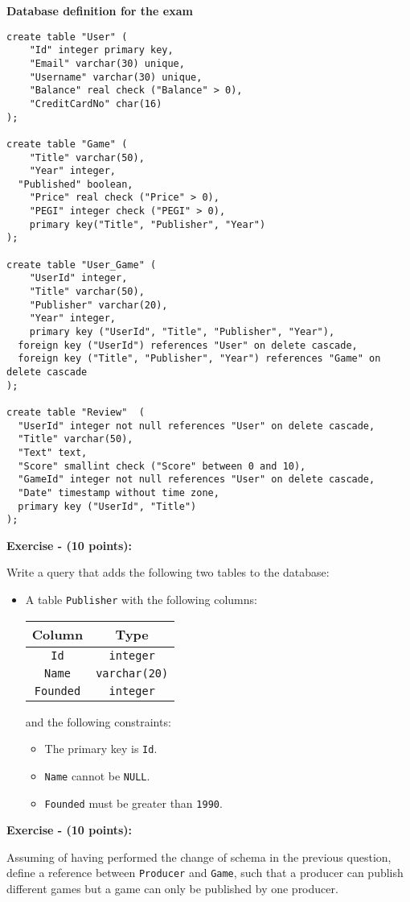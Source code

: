 \documentclass[10pt,a4paper]{article}
\title{\courseCode}
\date {  }
\newcounter{ExerciseCount}
\newcommand{\exercise}[2]{\noindent \textbf{Exercise \theExerciseCount \space - (#2 points):}
  
  \vspace{0.15cm}
 #1 \addtocounter{ExerciseCount}{1}
}
\begin{document}
%
\maketitle

\huge
\textbf{Database definition for the exam}
\normalsize


\begin{lstlisting}[frame=single]
create table "User" (
	"Id" integer primary key,
	"Email" varchar(30) unique,
	"Username" varchar(30) unique,
	"Balance" real check ("Balance" > 0),
	"CreditCardNo" char(16)
);

create table "Game" (
	"Title" varchar(50),
	"Year" integer,
  "Published" boolean,
	"Price" real check ("Price" > 0),
	"PEGI" integer check ("PEGI" > 0),
	primary key("Title", "Publisher", "Year")
);

create table "User_Game" (
	"UserId" integer,
	"Title" varchar(50),
	"Publisher" varchar(20),
	"Year" integer,
	primary key ("UserId", "Title", "Publisher", "Year"),
  foreign key ("UserId") references "User" on delete cascade,
  foreign key ("Title", "Publisher", "Year") references "Game" on delete cascade
);

create table "Review"  (
  "UserId" integer not null references "User" on delete cascade,
  "Title" varchar(50),
  "Text" text,
  "Score" smallint check ("Score" between 0 and 10),
  "GameId" integer not null references "User" on delete cascade,
  "Date" timestamp without time zone, 
  primary key ("UserId", "Title")
);
\end{lstlisting}

\newpage

\exercise{
  \noindent
  Write a query that adds the following two tables to the database:
  \begin{itemize}
  \item A table \texttt{Publisher} with the following columns:
    \begin{table}[!h]
      \centering
      \begin{tabular}{|c|c|}
        \hline
        \textbf{Column} & \textbf{Type}\\
        \hline
        \texttt{Id} & \texttt{integer}\\
        \hline
        \texttt{Name} & \texttt{varchar(20)}\\
        \hline
        \texttt{Founded} & \texttt{integer}\\
        \hline
      \end{tabular}
    \end{table}
    and the following constraints:
    \begin{itemize}
    \item The primary key is \texttt{Id}.
    \item \texttt{Name} cannot be \texttt{NULL}.
    \item \texttt{Founded} must be greater than \texttt{1990}. 
    \end{itemize}
  \end{itemize}
}{10}
\exercise{
Assuming of having performed the change of schema in the previous question, define a reference between \texttt{Producer} and \texttt{Game}, such that a producer can publish different games but a game can only be published by one producer.
}{10}
\end{document}
